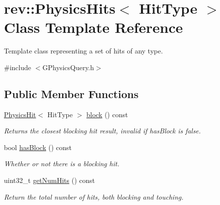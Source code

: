 \hypertarget{classrev_1_1_physics_hits}{}\section{rev\+::Physics\+Hits$<$ Hit\+Type $>$ Class Template Reference}
\label{classrev_1_1_physics_hits}


Template class representing a set of hits of any type.  




{\ttfamily \#include $<$G\+Physics\+Query.\+h$>$}

\subsection*{Public Member Functions}
\begin{DoxyCompactItemize}
\item 
\mbox{\label{classrev_1_1_physics_hits_acb56d51ea64e0a1388fc385901dea353}} 
\mbox{\hyperlink{classrev_1_1_physics_hit}{Physics\+Hit}}$<$ Hit\+Type $>$ \mbox{\hyperlink{classrev_1_1_physics_hits_acb56d51ea64e0a1388fc385901dea353}{block}} () const
\begin{DoxyCompactList}\small\item\em Returns the closest blocking hit result, invalid if has\+Block is false. \end{DoxyCompactList}\item 
\mbox{\label{classrev_1_1_physics_hits_aedb654a646bdf1ba4c01f4eb0acd1fca}} 
bool \mbox{\hyperlink{classrev_1_1_physics_hits_aedb654a646bdf1ba4c01f4eb0acd1fca}{has\+Block}} () const
\begin{DoxyCompactList}\small\item\em Whether or not there is a blocking hit. \end{DoxyCompactList}\item 
\mbox{\label{classrev_1_1_physics_hits_a0424b0c01a33dc3c3ff1495f4b0bfeac}} 
uint32\+\_\+t \mbox{\hyperlink{classrev_1_1_physics_hits_a0424b0c01a33dc3c3ff1495f4b0bfeac}{get\+Num\+Hits}} () const
\begin{DoxyCompactList}\small\item\em Return the total number of hits, both blocking and touching. \end{DoxyCompactList}\item 

\end{DoxyCompactItemize}
